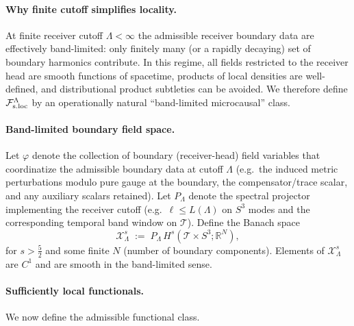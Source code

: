 \documentclass[10pt]{article}
\theoremstyle{definition}
\theoremstyle{plain}
\begin{document}
\paragraph{Why finite cutoff simplifies locality.}
At finite receiver cutoff $\Lambda<\infty$ the admissible receiver boundary data are effectively band-limited: only finitely many (or a
rapidly decaying) set of boundary harmonics contribute.  In this regime, all fields restricted to the receiver head are smooth functions of
spacetime, products of local densities are well-defined, and distributional product subtleties can be avoided.
We therefore define $\mathcal F_{\rm s.loc}^\Lambda$ by an operationally natural ``band-limited microcausal'' class.

\paragraph{Band-limited boundary field space.}
Let $\varphi$ denote the collection of boundary (receiver-head) field variables that coordinatize the admissible boundary data at cutoff $\Lambda$
(e.g.\ the induced metric perturbations modulo pure gauge at the boundary, the compensator/trace scalar, and any auxiliary scalars retained).
Let $P_\Lambda$ denote the spectral projector implementing the receiver cutoff (e.g.\ $\ell\le L(\Lambda)$ on $S^3$ modes and the corresponding
temporal band window on $\mathscr T$).  Define the Banach space
\begin{equation}
\mathcal X_\Lambda^s\;:=\;P_\Lambda\,H^s(\mathscr T\times S^3;\mathbb R^N),
\label{eq:XLambda}
\end{equation}
for $s>\frac{5}{2}$ and some finite $N$ (number of boundary components).  Elements of $\mathcal X_\Lambda^s$ are $C^1$ and are smooth in the
band-limited sense.

\paragraph{Sufficiently local functionals.}
We now define the admissible functional class.
\end{document}
